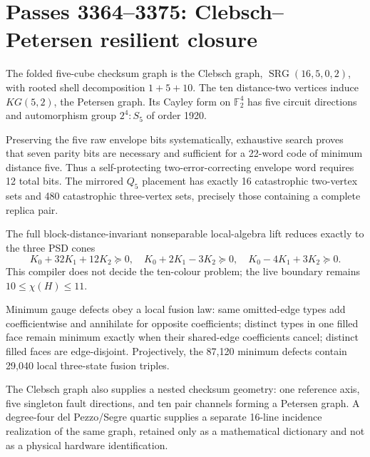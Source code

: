 \section*{Passes 3364--3375: Clebsch--Petersen resilient closure}
The folded five-cube checksum graph is the Clebsch graph, \(\operatorname{SRG}(16,5,0,2)\), with rooted shell decomposition \(1+5+10\). The ten distance-two vertices induce \(KG(5,2)\), the Petersen graph. Its Cayley form on \(\mathbb F_2^4\) has five circuit directions and automorphism group \(2^4{:}S_5\) of order 1920.

Preserving the five raw envelope bits systematically, exhaustive search proves that seven parity bits are necessary and sufficient for a 22-word code of minimum distance five. Thus a self-protecting two-error-correcting envelope word requires 12 total bits. The mirrored \(Q_5\) placement has exactly 16 catastrophic two-vertex sets and 480 catastrophic three-vertex sets, precisely those containing a complete replica pair.

The full block-distance-invariant nonseparable local-algebra lift reduces exactly to the three PSD cones
\[
K_0+32K_1+12K_2\succeq0,\quad K_0+2K_1-3K_2\succeq0,\quad K_0-4K_1+3K_2\succeq0.
\]
This compiler does not decide the ten-colour problem; the live boundary remains \(10\leq\chi(H)\leq11\).

Minimum gauge defects obey a local fusion law: same omitted-edge types add coefficientwise and annihilate for opposite coefficients; distinct types in one filled face remain minimum exactly when their shared-edge coefficients cancel; distinct filled faces are edge-disjoint. Projectively, the 87,120 minimum defects contain 29,040 local three-state fusion triples.

The Clebsch graph also supplies a nested checksum geometry: one reference axis, five singleton fault directions, and ten pair channels forming a Petersen graph. A degree-four del Pezzo/Segre quartic supplies a separate 16-line incidence realization of the same graph, retained only as a mathematical dictionary and not as a physical hardware identification.

